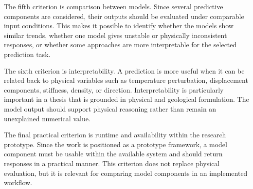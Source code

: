 The fifth criterion is comparison between models. Since several predictive components are considered, their outputs should be evaluated under comparable input conditions. This makes it possible to identify whether the models show similar trends, whether one model gives unstable or physically inconsistent responses, or whether some approaches are more interpretable for the selected prediction task.

The sixth criterion is interpretability. A prediction is more useful when it can be related back to physical variables such as temperature perturbation, displacement components, stiffness, density, or direction. Interpretability is particularly important in a thesis that is grounded in physical and geological formulation. The model output should support physical reasoning rather than remain an unexplained numerical value.

The final practical criterion is runtime and availability within the research prototype. Since the work is positioned as a prototype framework, a model component must be usable within the available system and should return responses in a practical manner. This criterion does not replace physical evaluation, but it is relevant for comparing model components in an implemented workflow.
